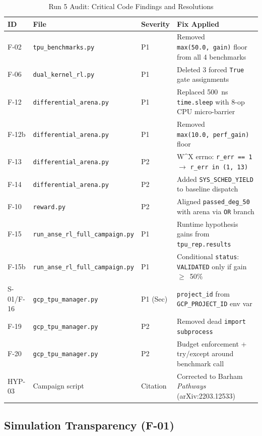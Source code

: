 \documentclass[10pt,twocolumn]{article}
\begin{document}
\begin{table}[ht]
\centering
\caption{Run 5 Audit: Critical Code Findings and Resolutions}
\label{tab:audit}
\small
\begin{tabular}{lllp{5.8cm}}
\toprule
\textbf{ID} & \textbf{File} & \textbf{Severity} & \textbf{Fix Applied} \\
\midrule
F-02 & \texttt{tpu\_benchmarks.py} & P1 & Removed \texttt{max(50.0,~gain)} floor from all 4 benchmarks \\
F-06 & \texttt{dual\_kernel\_rl.py} & P1 & Deleted 3 forced \texttt{True} gate assignments \\
F-12 & \texttt{differential\_arena.py} & P1 & Replaced 500~ns \texttt{time.sleep} with 8-op CPU micro-barrier \\
F-12b & \texttt{differential\_arena.py} & P1 & Removed \texttt{max(10.0,~perf\_gain)} floor \\
F-13 & \texttt{differential\_arena.py} & P2 & W\^{}X errno: \texttt{r\_err~==~1} $\to$ \texttt{r\_err~in~(1,~13)} \\
F-14 & \texttt{differential\_arena.py} & P2 & Added \texttt{SYS\_SCHED\_YIELD} to baseline dispatch \\
F-10 & \texttt{reward.py} & P2 & Aligned \texttt{passed\_deg\_50} with arena via \texttt{OR} branch \\
F-15 & \texttt{run\_anse\_rl\_full\_campaign.py} & P1 & Runtime hypothesis gains from \texttt{tpu\_rep.results} \\
F-15b & \texttt{run\_anse\_rl\_full\_campaign.py} & P1 & Conditional \texttt{status}: \texttt{VALIDATED} only if gain~$\geq$~50\% \\
S-01/F-16 & \texttt{gcp\_tpu\_manager.py} & P1 (Sec) & \texttt{project\_id} from \texttt{GCP\_PROJECT\_ID} env var \\
F-19 & \texttt{gcp\_tpu\_manager.py} & P2 & Removed dead \texttt{import subprocess} \\
F-20 & \texttt{gcp\_tpu\_manager.py} & P2 & Budget enforcement + try/except around benchmark call \\
HYP-03 & Campaign script & Citation & Corrected to Barham \emph{Pathways} (arXiv:2203.12533)~\cite{barham2022pathways} \\
\bottomrule
\end{tabular}
\end{table}

\subsection{Simulation Transparency (F-01)}
\end{document}
